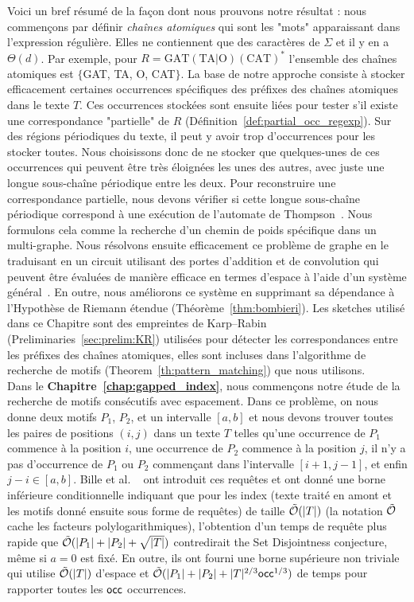 Voici un bref résumé de la façon dont nous prouvons notre résultat : nous commençons par définir \emph{chaînes atomiques} qui sont les "mots" apparaissant dans l'expression régulière. Elles ne contiennent que des caractères de $\Sigma$ et il y en a $\Theta(d)$. Par exemple, pour $R= \mathrm{GAT}(\mathrm{TA} | \mathrm{O})(\mathrm{CAT})^*$ l'ensemble des chaînes atomiques est $\{$GAT, TA, O, CAT$\}$.
%
La base de notre approche consiste à stocker efficacement certaines occurrences spécifiques des préfixes des chaînes atomiques dans le texte $T$. Ces occurrences stockées sont ensuite liées pour tester s'il existe une correspondance "partielle" de $R$ (Définition~\ref*{def:partial_occ_regexp}).
Sur des régions périodiques du texte, il peut y avoir trop d'occurrences pour les stocker toutes.
Nous choisissons donc de ne stocker que quelques-unes de ces occurrences qui peuvent être très éloignées les unes des autres, avec juste une longue sous-chaîne périodique entre les deux. Pour reconstruire une correspondance partielle, nous devons vérifier si cette longue sous-chaîne périodique correspond à une exécution de l'automate de Thompson~\cite{Thompson_automaton}. Nous formulons cela comme la recherche d'un chemin de poids spécifique dans un multi-graphe. Nous résolvons ensuite efficacement ce problème de graphe en le traduisant en un circuit utilisant des portes d'addition et de convolution qui peuvent être évaluées de manière efficace en termes d'espace à l'aide d'un système général~\cite{LokshtanovN10,Bringmann17}. En outre, nous améliorons ce système en supprimant sa dépendance à l'Hypothèse de Riemann étendue (Théorème~\ref{thm:bombieri}). 
%
Les sketches utilisé dans ce Chapitre sont des empreintes de Karp--Rabin (Preliminaries~\ref{sec:prelim:KR}) utilisées pour détecter les correspondances entre les préfixes des chaînes atomiques, elles sont incluses dans l'algorithme de recherche de motifs (Theorem~\ref{th:pattern_matching}) que nous utilisons.\\

Dans le \textbf{Chapitre~\ref{chap:gapped_index}}, nous commençons notre étude de la recherche de motifs consécutifs avec espacement. Dans ce problème, on nous donne deux motifs $P_1$, $P_2$, et un intervalle $[a,b]$ et nous devons trouver toutes les paires de positions $(i,j)$ dans un texte $T$ telles qu'une occurrence de $P_1$ commence à la position $i$, une occurrence de $P_2$ commence à la position $j$, il n'y a pas d'occurrence de $P_1$ ou $P_2$ commençant dans l'intervalle $[i+1,j-1]$, et enfin $j-i \in [a,b]$.
%
Bille et al. ~\cite{bille2022gapped} ont introduit ces requêtes et ont donné une borne inférieure conditionnelle indiquant que pour les index (texte traité en amont et les motifs donné ensuite sous forme de requêtes) de taille $\tilde {\mathcal{O}}(|T|)$ (la notation $\tilde {\mathcal{O}}$ cache les facteurs polylogarithmiques), l'obtention d'un temps de requête plus rapide que $\tilde {\mathcal{O}}(|P_1|+|P_2|+\sqrt{|T|})$ contredirait the Set Disjointness conjecture, même si $a=0$ est fixé. En outre, ils ont fourni une borne supérieure non triviale qui utilise $\tilde {\mathcal{O}}(|T|)$ d'espace et $\tilde {\mathcal{O}} (|P_1| +|P_2| + |T|^{2/3}\mathsf{occ}^{1/3})$ de temps pour rapporter toutes les $\mathsf{occ}$ occurrences.

